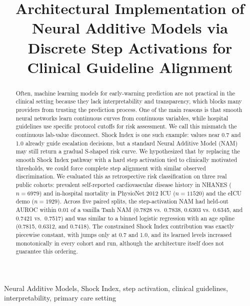 \documentclass[conference]{IEEEtran}
\begin{document}
\title{Architectural Implementation of Neural Additive Models via Discrete Step Activations for Clinical Guideline Alignment}

\author{
}

\maketitle

\begin{abstract}
Often, machine learning models for early-warning prediction are not practical in the clinical setting because they lack interpretability and transparency, which blocks many providers from trusting the prediction process. One of the main reasons is that smooth neural networks learn continuous curves from continuous variables, while hospital guidelines use specific protocol cutoffs for risk assessment. We call this mismatch the continuous lab-value disconnect. Shock Index is one such example: values near 0.7 and 1.0 already guide escalation decisions, but a standard Neural Additive Model (NAM) may still return a gradual S-shaped risk curve. We hypothesized that by replacing the smooth Shock Index pathway with a hard step activation tied to clinically motivated thresholds, we could force complete step alignment with similar observed discrimination. We evaluated this as retrospective risk classification on three real public cohorts: prevalent self-reported cardiovascular disease history in NHANES ($n{=}6979$) and in-hospital mortality in PhysioNet 2012 ICU ($n{=}11520$) and the eICU demo ($n{=}1929$). Across five paired splits, the step-activation NAM had held-out AUROC within 0.01 of a vanilla Tanh NAM (0.7828 vs.\ 0.7838, 0.6303 vs.\ 0.6345, and 0.7421 vs.\ 0.7517) and was similar to a binned logistic regression with an age spline (0.7815, 0.6312, and 0.7418). The constrained Shock Index contribution was exactly piecewise constant, with jumps only at 0.7 and 1.0, and its learned levels increased monotonically in every cohort and run, although the architecture itself does not guarantee this ordering.
\end{abstract}

\begin{IEEEkeywords}
Neural Additive Models, Shock Index, step activation, clinical guidelines, interpretability, primary care setting
\end{IEEEkeywords}
\end{document}
